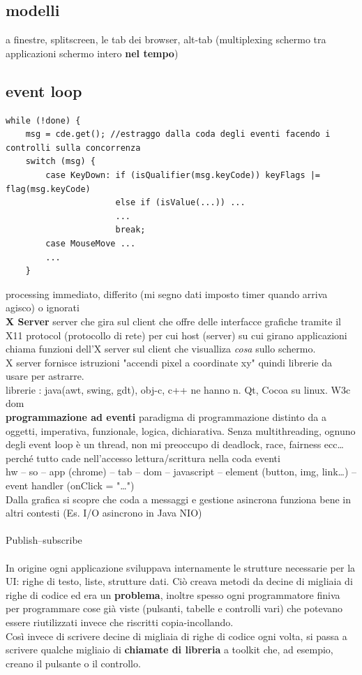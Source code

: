 \documentclass[10pt]{article}
\begin{document}
\subsection{modelli}
a finestre, splitscreen, le tab dei browser, alt-tab (multiplexing schermo tra applicazioni schermo intero \textbf{nel tempo})
\subsection{event loop}
\begin{verbatim}
while (!done) {
    msg = cde.get(); //estraggo dalla coda degli eventi facendo i controlli sulla concorrenza
    switch (msg) {
        case KeyDown: if (isQualifier(msg.keyCode)) keyFlags |= flag(msg.keyCode)
                      else if (isValue(...)) ...
                      ...
                      break;
        case MouseMove ...
        ...
    }		
\end{verbatim}
processing immediato, differito (mi segno dati imposto timer quando arriva agisco) o ignorati\\
\textbf{X Server} server che gira sul client che offre delle interfacce grafiche tramite il X11 protocol (protocollo di rete) per cui host (server) su cui girano applicazioni chiama funzioni dell'X server sul client che visualliza \textit{cosa} sullo schermo.\\
X server fornisce istruzioni "accendi pixel a coordinate xy" quindi librerie da usare per astrarre.\\
librerie : java(awt, swing, gdt), obj-c, c++ ne hanno n. Qt, Cocoa su linux. W3c dom\\
\textbf{programmazione ad eventi} paradigma di programmazione distinto da a oggetti, imperativa, funzionale, logica, dichiarativa. Senza multithreading, ognuno degli event loop è un thread, non mi preoccupo di deadlock, race, fairness ecc\ldots perché tutto cade nell'accesso lettura/scrittura nella coda eventi\\
hw -- so -- app (chrome) -- tab -- dom -- javascript -- element (button, img, link\ldots) -- event handler (onClick = "\ldots")\\
Dalla grafica si scopre che coda a messaggi e gestione asincrona funziona bene in altri contesti (Es. I/O asincrono in Java NIO)\\\\
Publish--subscribe
\paragraph{} In origine ogni applicazione sviluppava internamente le strutture necessarie per la UI: righe di testo, liste, strutture dati. Ciò creava metodi da decine di migliaia di righe di codice ed era un \textbf{problema}, inoltre spesso ogni programmatore finiva per programmare cose già viste (pulsanti, tabelle e controlli vari) che potevano essere riutilizzati invece che riscritti copia-incollando.\\
Così invece di scrivere decine di migliaia di righe di codice ogni volta, si passa a scrivere qualche migliaio di \textbf{chiamate di libreria} a toolkit che, ad esempio, creano il pulsante o il controllo.
\end{document}
